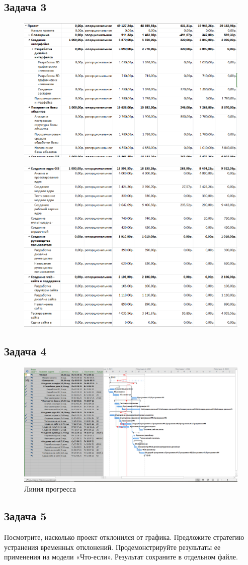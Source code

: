 \subsection{Задача 3}
\begin{figure}[H]
	\centering
	\includegraphics[width=0.7\linewidth]{src/4_11}
	\caption{}
	\label{fig:411}
\end{figure}
\begin{figure}[H]
	\centering
	\includegraphics[width=0.7\linewidth]{src/4_12}
	\caption{}
	\label{fig:412}
\end{figure}

\subsection{Задача 4}
\begin{figure}[H]
	\centering
	\includegraphics[width=0.7\linewidth]{src/4_13}
	\caption{Линия прогресса}
	\label{fig:413}
\end{figure}

\subsection{Задача 5}
Посмотрите, насколько проект отклонился от графика. 
Предложите стратегию устранения временных отклонений. 
Продемонстрируйте результаты ее применения на модели «Что-если». 
Результат сохраните в отдельном файле.








